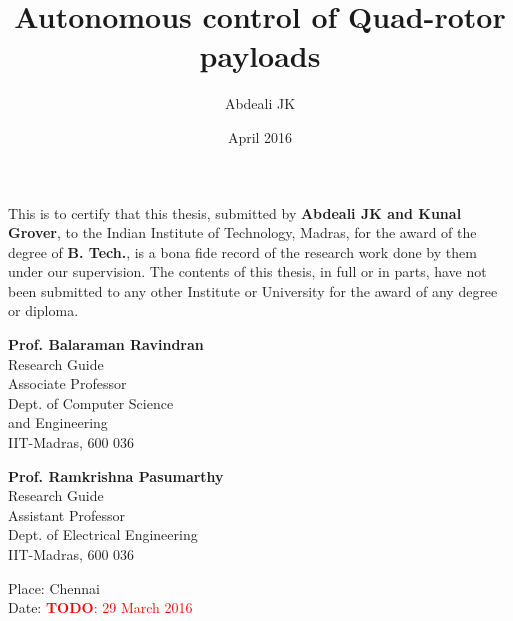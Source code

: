 \documentclass[BTech]{iitmdiss}
\newcommand\todo[1]{\textcolor{red}{{\bf TODO}: #1}}
\begin{document}

\title{Autonomous control of Quad-rotor payloads}

\author{Abdeali JK}

\date{April 2016}

\maketitle

\certificate

\vspace*{0.5in}

\noindent This is to certify that this thesis, submitted by {\bf Abdeali JK and Kunal Grover}, to the Indian Institute of Technology, Madras, for the award of the degree of {\bf B. Tech.}, is a bona fide record of the research work done by them under our supervision. The contents of this thesis, in full or in parts, have not been submitted to any other Institute or University for the award of any degree or diploma.

\vspace*{1.5in}

\begin{singlespacing}

\begin{minipage}[t]{0.45\textwidth}
  {\bf Prof. Balaraman Ravindran} \\
  Research Guide \\
  Associate Professor \\
  Dept. of Computer Science \\
  and Engineering \\
  IIT-Madras, 600 036
\end{minipage}
\hfill
\begin{minipage}[t]{0.45\textwidth}
  {\bf Prof. Ramkrishna Pasumarthy} \\
  Research Guide \\
  Assistant Professor \\
  Dept. of Electrical Engineering \\
  IIT-Madras, 600 036
\end{minipage}

\end{singlespacing}

\vspace*{0.25in}
\noindent Place: Chennai\\
Date: \todo{29 March 2016}
\end{document}
